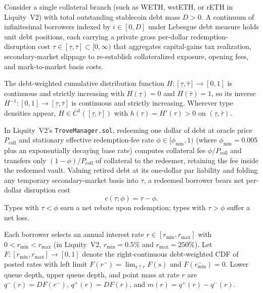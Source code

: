 Consider a single collateral branch (such as WETH, wstETH, or rETH in Liquity~V2) with total outstanding stablecoin debt mass $D > 0$. A continuum of infinitesimal borrowers indexed by $i \in [0, D]$ under Lebesgue debt measure holds unit debt positions, each carrying a private gross per-dollar redemption-disruption cost $\tau \in [\underline{\tau}, \bar{\tau}] \subset [0, \infty)$ that aggregates capital-gains tax realization, secondary-market slippage to re-establish collateralized exposure, opening fees, and mark-to-market basis costs.

\begin{assumption}\label{assump:types}
The debt-weighted cumulative distribution function $H : [\underline{\tau}, \bar{\tau}] \to [0, 1]$ is continuous and strictly increasing with $H(\underline{\tau}) = 0$ and $H(\bar{\tau}) = 1$, so its inverse $H^{-1} : [0, 1] \to [\underline{\tau}, \bar{\tau}]$ is continuous and strictly increasing. Wherever type densities appear, $H \in C^1([\underline{\tau}, \bar{\tau}])$ with $h(\tau) = H'(\tau) > 0$ on $(\underline{\tau}, \bar{\tau})$.
\end{assumption}

In Liquity~V2's \texttt{TroveManager.sol}, redeeming one dollar of debt at oracle price $P_{\mathrm{coll}}$ and stationary effective redemption-fee rate $\phi \in [\phi_{\min}, 1)$ (where $\phi_{\min} = 0.005$ plus an exponentially decaying base rate) computes collateral fee $\phi / P_{\mathrm{coll}}$ and transfers only $(1 - \phi)/P_{\mathrm{coll}}$ of collateral to the redeemer, retaining the fee inside the redeemed vault. Valuing retired debt at its one-dollar par liability and folding any temporary secondary-market basis into $\tau$, a redeemed borrower bears net per-dollar disruption cost
\begin{equation}\label{eq:net_cost}
c(\tau; \phi) = \tau - \phi.
\end{equation}
Types with $\tau < \phi$ earn a net rebate upon redemption; types with $\tau > \phi$ suffer a net loss.

Each borrower selects an annual interest rate $r \in [r_{\min}, r_{\max}]$ with $0 < r_{\min} < r_{\max}$ (in Liquity~V2, $r_{\min} = 0.5\%$ and $r_{\max} = 250\%$). Let $F : [r_{\min}, r_{\max}] \to [0, 1]$ denote the right-continuous debt-weighted CDF of posted rates with left limit $F(r^-) = \lim_{s \uparrow r} F(s)$ and $F(r_{\min}^-) = 0$. Lower queue depth, upper queue depth, and point mass at rate $r$ are $q^-(r) = D F(r^-)$, $q^+(r) = D F(r)$, and $m(r) = q^+(r) - q^-(r)$.

